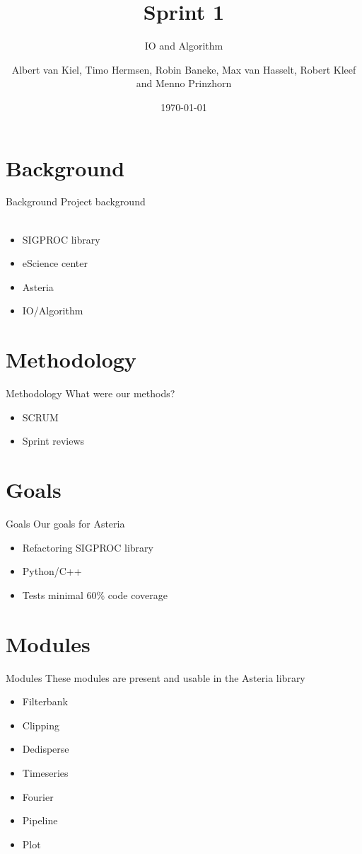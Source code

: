 \documentclass{beamer}
\title{Sprint 1}
\subtitle{IO and Algorithm}
\author{Albert van Kiel, Timo Hermsen, Robin Baneke, Max van Hasselt, Robert Kleef and Menno Prinzhorn}
\date{\today}
\begin{document}
\begin{frame}
    \titlepage
\end{frame}

\section{Background}
    
\begin{frame}{Background}
    Project background
    \\~\\
    \begin{itemize}
        \item SIGPROC library
        \item eScience center
        \item Asteria
        \item IO/Algorithm
    \end{itemize}
\end{frame}

\section{Methodology}
	\begin{frame}{Methodology}
	What were our methods?     
	\begin{itemize}
		\item SCRUM
		\item Sprint reviews
	\end{itemize}
\end{frame}

\section{Goals}
\begin{frame}{Goals}
    Our goals for Asteria      
    \begin{itemize}
        \item Refactoring SIGPROC library
        \item Python/C++
        \item Tests minimal 60\% code coverage
    \end{itemize}
\end{frame}

\section{Modules}
\begin{frame}{Modules}
	These modules are present and usable in the Asteria library     
	\begin{itemize}
		\item Filterbank
		\item Clipping
		\item Dedisperse
		\item Timeseries
		\item Fourier
		\item Pipeline
		\item Plot
	\end{itemize}
\end{frame}
\end{document}
